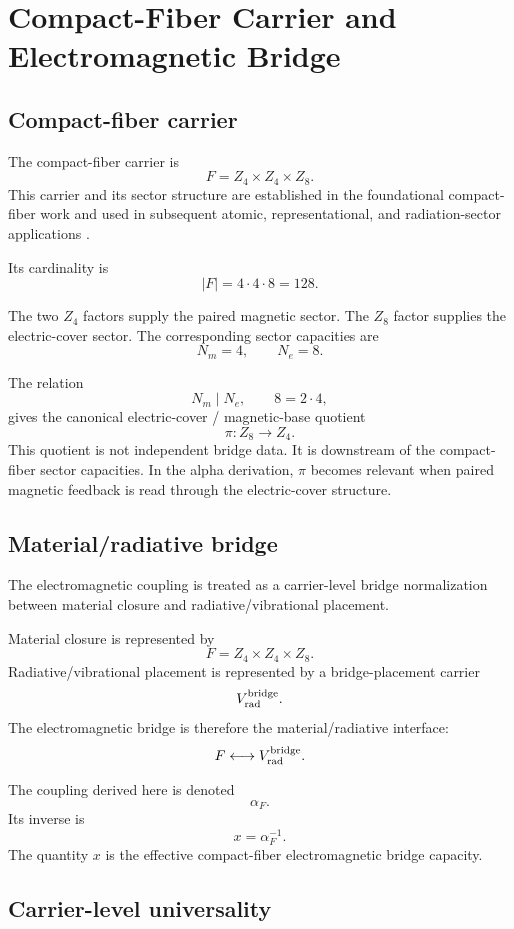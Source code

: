\section{Compact-Fiber Carrier and Electromagnetic Bridge}

\subsection{Compact-fiber carrier}

The compact-fiber carrier is
\[
F=Z_4\times Z_4\times Z_8.
\]
This carrier and its sector structure are established in the foundational compact-fiber work and used in subsequent atomic, representational, and radiation-sector applications \cite{Wells2026PaperI,Wells2026PaperII,Wells2026PaperIII,Wells2026Radiation}.

Its cardinality is
\[
|F|=4\cdot4\cdot8=128.
\]

The two \(Z_4\) factors supply the paired magnetic sector. The \(Z_8\) factor supplies the electric-cover sector. The corresponding sector capacities are
\[
N_m=4,
\qquad
N_e=8.
\]

The relation
\[
N_m\mid N_e,
\qquad
8=2\cdot4,
\]
gives the canonical electric-cover / magnetic-base quotient
\[
\pi:Z_8\to Z_4.
\]
This quotient is not independent bridge data. It is downstream of the compact-fiber sector capacities. In the alpha derivation, \(\pi\) becomes relevant when paired magnetic feedback is read through the electric-cover structure.

\subsection{Material/radiative bridge}

The electromagnetic coupling is treated as a carrier-level bridge normalization between material closure and radiative/vibrational placement.

Material closure is represented by
\[
F=Z_4\times Z_4\times Z_8.
\]
Radiative/vibrational placement is represented by a bridge-placement carrier
\[
V_{\rm rad}^{\rm bridge}.
\]
The electromagnetic bridge is therefore the material/radiative interface:
\[
F
\longleftrightarrow
V_{\rm rad}^{\rm bridge}.
\]

The coupling derived here is denoted
\[
\alpha_F.
\]
Its inverse is
\[
x=\alpha_F^{-1}.
\]
The quantity \(x\) is the effective compact-fiber electromagnetic bridge capacity.

\subsection{Carrier-level universality}


